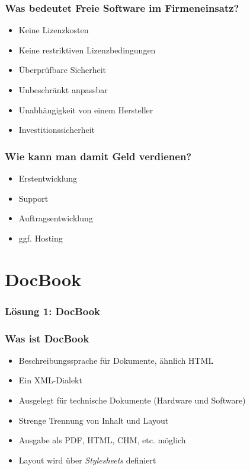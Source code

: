 \documentclass{beamer}
\begin{document}
\begin{frame}
\frametitle{Was bedeutet Freie Software im Firmeneinsatz?}
\begin{itemize}
\item Keine Lizenzkosten
\item Keine restriktiven Lizenzbedingungen
\item Überprüfbare Sicherheit
\item Unbeschränkt anpassbar
\item Unabhängigkeit von einem Hersteller
\item Investitionssicherheit
\end{itemize}
\end{frame}

\begin{frame}
\frametitle{Wie kann man damit Geld verdienen?}
\begin{itemize}
\item Erstentwicklung
\item Support
\item Auftragsentwicklung
\item ggf. Hosting
\end{itemize}
\end{frame}

\section{DocBook}

\begin{frame}[fragile]
\lstset{language=XML,basicstyle=\small\ttfamily}
\frametitle{Lösung 1: DocBook}


\end{frame}

\begin{frame}
\frametitle{Was ist DocBook}
\begin{itemize}
\item Beschreibungssprache für Dokumente, ähnlich HTML
\item Ein XML-Dialekt
\item Ausgelegt für technische Dokumente (Hardware und Software)
\item Strenge Trennung von Inhalt und Layout
\item Ausgabe als PDF, HTML, CHM, etc. möglich
\item Layout wird über \emph{Stylesheets} definiert
\end{itemize}
\end{frame}
\end{document}
